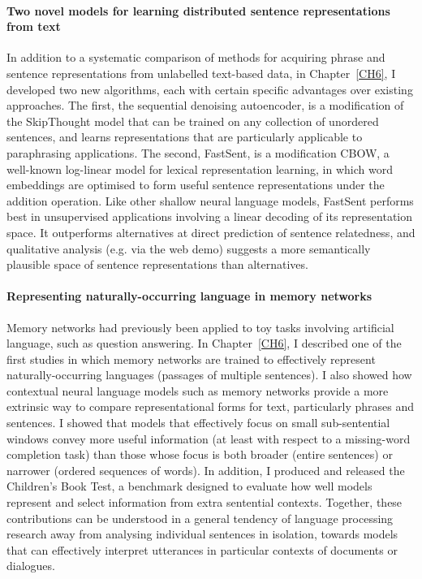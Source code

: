 \paragraph{Two novel models for learning distributed sentence representations from text} In addition to a systematic comparison of methods for acquiring phrase and sentence representations from unlabelled text-based data, in Chapter~\ref{CH6}, I developed two new algorithms, each with certain specific advantages over existing approaches. The first, the sequential denoising autoencoder, is a modification of the SkipThought model that can be trained on any collection of unordered sentences, and learns representations that are particularly applicable to paraphrasing applications. The second, FastSent, is a modification CBOW, a well-known log-linear model for lexical representation learning, in which word embeddings are optimised to form useful sentence representations under the addition operation. Like other shallow neural language models, FastSent performs best in unsupervised applications involving a linear decoding of its representation space. It outperforms alternatives at direct prediction of sentence relatedness, and qualitative analysis (e.g. via the web demo) suggests a more semantically plausible space of sentence representations than alternatives.       

\paragraph{Representing naturally-occurring language in memory networks} Memory networks had previously been applied to toy tasks involving artificial language, such as question answering. In Chapter~\ref{CH6}, I described one of the first studies in which memory networks are trained to effectively represent naturally-occurring languages (passages of multiple sentences). I also showed how contextual neural language models such as memory networks provide a more extrinsic way to compare representational forms for text, particularly phrases and sentences. I showed that models that effectively focus on small sub-sentential windows convey more useful information (at least with respect to a missing-word completion task) than those whose focus is both broader (entire sentences) or narrower (ordered sequences of words). In addition, I produced and released the Children's Book Test, a benchmark designed to evaluate how well models represent and select information from extra sentential contexts. Together, these contributions can be understood in a general tendency of language processing research away from analysing individual sentences in isolation, towards models that can effectively interpret utterances in particular contexts of documents or dialogues.  

